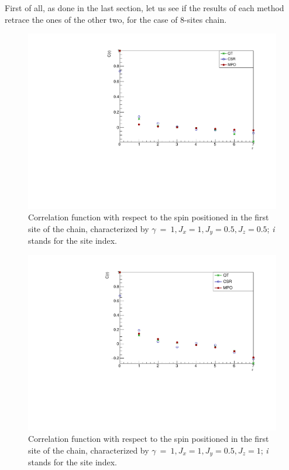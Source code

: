 First of all, as done in the last section, let us see if the results of each method retrace the ones of the other two, for the case of 8-sites chain. 

\begin{figure}[H]
    \centering
    \includegraphics[scale=0.7]{Figures/8sites_comparison/CorrFunc1_8s_J10505.pdf}
    \caption{Correlation function with respect to the spin positioned in the first site of the chain, characterized by $\gamma~=~1, J_x=1, J_y=0.5, J_z=0.5$; \emph{i} stands for the site index.}
    \label{fig:my_label}
\end{figure}

\begin{figure}[H]
    \centering
    \includegraphics[scale=0.7]{Figures/8sites_comparison/CorrFunc1_8s_J1051.pdf}
    \caption{Correlation function with respect to the spin positioned in the first site of the chain, characterized by $\gamma~=~1, J_x=1, J_y=0.5, J_z=1$; \emph{i} stands for the site index.}
    \label{fig:my_label}
\end{figure}

